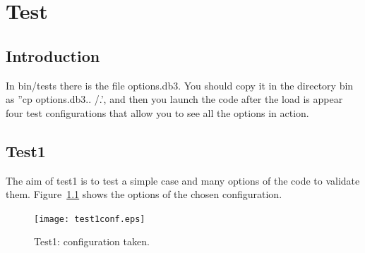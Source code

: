 \chapter{Test}\label{chaptest}

\minitoc

\section{Introduction}

In bin/tests there is the file options.db3. You should copy it in the
directory bin as ''cp options.db3.. /.', and then you launch the code
after the load is appear four test configurations that allow you to
see all the options in action.


\section{Test1}

The aim of test1 is to test a simple case and many options of the code
to validate them. Figure~\ref{test1conf} shows the options of the
chosen configuration.


\begin{figure}[H]
\begin{center}
  \texttt{[image: test1conf.eps]}
\end{center}
\caption{Test1: configuration taken.}
\label{test1conf}
\end{figure}

